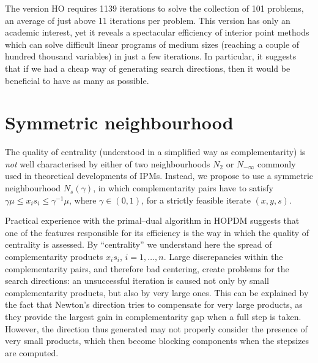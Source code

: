The version HO\raisebox{1pt}{-$\infty$} requires 1139 iterations to solve 
the collection of 101 problems, an average of just above 11 iterations
per problem. This version has only an academic interest, 
yet it reveals a spectacular efficiency of interior point 
methods which can solve difficult linear programs of medium sizes 
(reaching a couple of hundred thousand variables) in just 
a few iterations.
In particular, it suggests that if we had a cheap way of generating
search directions, then it would be beneficial to have as many as possible.


%
%
\section{Symmetric neighbourhood}
\label{sec:SymNeighbourhood}

The quality of centrality (understood in a simplified way as complementarity)
is {\it not} well characterised by either of two neighbourhoods 
$N_2$ or $N_{-\infty}$ commonly used in theoretical developments of IPMs.
Instead, we propose to use a symmetric neighbourhood $N_s(\gamma)$,
in which complementarity pairs have to satisfy 
$\gamma \mu \leq x_i s_i \leq \gamma^{-1} \mu$, where $\gamma \in (0,1)$, 
for a strictly feasible iterate $(x,y,s)$.


Practical experience with the primal--dual algorithm in HOPDM \cite{HOPDM}
suggests that one of the features responsible 
for its efficiency is the way in which the quality of centrality 
is assessed. By ``centrality'' we understand here the spread 
of complementarity products $x_i s_i$, $i = 1,\dots,n$.
Large discrepancies within the complementarity 
pairs, and therefore bad centering, create problems for the search 
directions: an unsuccessful iteration is caused not only by small
complementarity products, but also by very large ones.
%
 This can be explained by the fact that
Newton's direction tries to compensate for very 
large products, as they provide the largest gain in complementarity 
gap when a full step is taken. However, the direction thus generated 
may not properly consider the presence of very small products, 
which then become blocking components when the stepsizes are computed.

